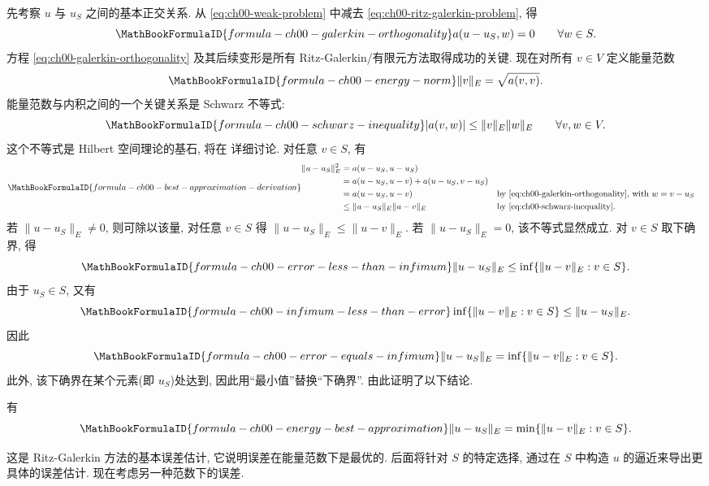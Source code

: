 先考察 $u$ 与 $u_S$ 之间的基本正交关系. 从 \eqref{eq:ch00-weak-problem} 中减去 \eqref{eq:ch00-ritz-galerkin-problem}, 得
\setcounter{equation}{0}
\begin{equation}
\MathBookFormulaID{formula-ch00-galerkin-orthogonality}
a(u-u_S,w)=0\qquad\forall w\in S.
\label{eq:ch00-galerkin-orthogonality}
\end{equation}
方程 \eqref{eq:ch00-galerkin-orthogonality} 及其后续变形是所有 Ritz-Galerkin/有限元方法取得成功的关键. 现在对所有 $v\in V$ 定义能量范数
\[
\MathBookFormulaID{formula-ch00-energy-norm}
\|v\|_E=\sqrt{a(v,v)}.
\]
能量范数与内积之间的一个关键关系是 Schwarz 不等式:
\begin{equation}
\MathBookFormulaID{formula-ch00-schwarz-inequality}
|a(v,w)|\leq\|v\|_E\|w\|_E
\qquad\forall v,w\in V.
\label{eq:ch00-schwarz-inequality}
\end{equation}
这个不等式是 Hilbert 空间理论的基石, 将在  详细讨论. 对任意 $v\in S$, 有
\[
\MathBookFormulaID{formula-ch00-best-approximation-derivation}
\begin{aligned}
\|u-u_S\|_E^2
&=a(u-u_S,u-u_S)\\
&=a(u-u_S,u-v)+a(u-u_S,v-u_S)\\
&=a(u-u_S,u-v) &&\text{by \eqref{eq:ch00-galerkin-orthogonality}, with $w=v-u_S$}\\
&\leq\|u-u_S\|_E\|u-v\|_E &&\text{by \eqref{eq:ch00-schwarz-inequality}}.
\end{aligned}
\]
若 $\|u-u_S\|_E\neq0$, 则可除以该量, 对任意 $v\in S$ 得 $\|u-u_S\|_E\leq\|u-v\|_E$. 若 $\|u-u_S\|_E=0$, 该不等式显然成立. 对 $v\in S$ 取下确界, 得
\[
\MathBookFormulaID{formula-ch00-error-less-than-infimum}
\|u-u_S\|_E\leq\inf\{\|u-v\|_E:v\in S\}.
\]
由于 $u_S\in S$, 又有
\[
\MathBookFormulaID{formula-ch00-infimum-less-than-error}
\inf\{\|u-v\|_E:v\in S\}\leq\|u-u_S\|_E.
\]
因此
\[
\MathBookFormulaID{formula-ch00-error-equals-infimum}
\|u-u_S\|_E=\inf\{\|u-v\|_E:v\in S\}.
\]
此外, 该下确界在某个元素(即 $u_S$)处达到, 因此用``最小值''替换``下确界''. 由此证明了以下结论.

\setcounter{thmcount}{2}
\begin{Theorem}
\label{thm:ch00-energy-best-approximation}
有
\[
\MathBookFormulaID{formula-ch00-energy-best-approximation}
\|u-u_S\|_E=\min\{\|u-v\|_E:v\in S\}.
\]
\end{Theorem}

这是 Ritz-Galerkin 方法的基本误差估计, 它说明误差在能量范数下是最优的. 后面将针对 $S$ 的特定选择, 通过在 $S$ 中构造 $u$ 的逼近来导出更具体的误差估计. 现在考虑另一种范数下的误差.


